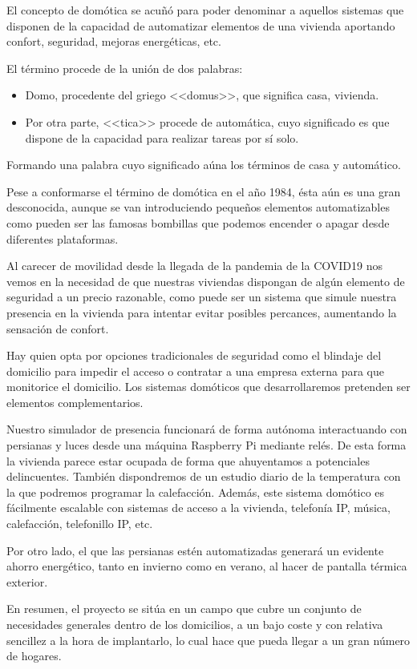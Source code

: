 
El concepto de domótica se acuñó para poder denominar a aquellos sistemas que disponen de la capacidad de automatizar elementos de una vivienda aportando confort, seguridad, mejoras energéticas, etc.

El término procede de la unión de dos palabras:

\begin{itemize}
    \item Domo, procedente del griego <<domus>>, que significa casa, vivienda.
    \item Por otra parte, <<tica>> procede de automática, cuyo significado es que dispone de la capacidad para realizar tareas por sí solo.
\end{itemize}

Formando una palabra cuyo significado aúna los términos de casa y automático.

Pese a conformarse el término de domótica en el año 1984, ésta aún es una gran desconocida, aunque se van introduciendo pequeños elementos automatizables como pueden ser las famosas bombillas que podemos encender o apagar desde diferentes plataformas.

Al carecer de movilidad desde la llegada de la pandemia de la COVID19 nos vemos en la necesidad de que nuestras viviendas dispongan de algún elemento de seguridad a un precio razonable, como puede ser un sistema que simule nuestra presencia en la vivienda para intentar evitar posibles percances, aumentando la sensación de confort.

Hay quien opta por opciones tradicionales de seguridad como el blindaje del domicilio para impedir el acceso o contratar a una empresa externa para que monitorice el domicilio. Los sistemas domóticos que desarrollaremos pretenden ser elementos complementarios.

Nuestro simulador de presencia funcionará de forma autónoma interactuando con persianas y luces desde una máquina Raspberry Pi mediante relés. De esta forma la vivienda parece estar ocupada de forma que ahuyentamos a potenciales delincuentes. También dispondremos de un estudio diario de la temperatura con la que podremos programar la calefacción. Además, este sistema domótico es fácilmente escalable con sistemas de acceso a la vivienda, telefonía IP, música, calefacción, telefonillo IP, etc.

Por otro lado, el que las persianas estén automatizadas generará un evidente ahorro energético, tanto en invierno como en verano, al hacer de pantalla térmica exterior.

En resumen, el proyecto se sitúa en un campo que cubre un conjunto de necesidades generales dentro de los domicilios, a un bajo coste y con relativa sencillez a la hora de implantarlo, lo cual hace que pueda llegar a un gran número de hogares.
